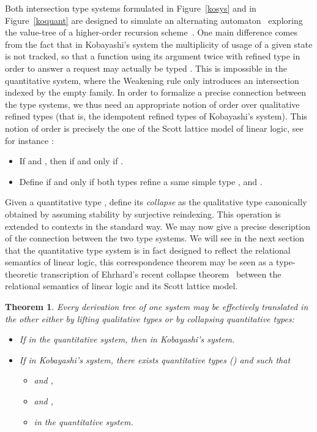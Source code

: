 \documentclass{eptcs}
\newtheorem{theorem}{Theorem}
\begin{document}
Both intersection type systems formulated in Figure~\ref{kosys}
and in Figure~\ref{koquant} are designed to simulate an alternating automaton~
exploring the value-tree of a higher-order recursion scheme~.
One main difference comes from the fact that in Kobayashi's system the multiplicity of usage 
of a given state is not tracked, so that a function using its argument twice with refined type 
in order to answer a request  may actually be typed . 
This is impossible in the quantitative system, where the Weakening rule only introduces an intersection indexed by the empty family. In order to formalize a precise connection between the type systems, we thus need an appropriate notion of order over qualitative refined types (that is, the idempotent refined types of Kobayashi's system). 
This notion of order is precisely the one of the Scott lattice model of linear logic, see for instance \cite{terui,ehrhard-collapse}:
\begin{itemize}
\item If  and , then  if and only if .
\item Define  if and only if both types refine a same simple type ,  and .
\end{itemize}
Given a quantitative type , define its \emph{collapse}  as the qualitative type canonically obtained by assuming stability by surjective reindexing. 
This operation is extended to contexts in the standard way. 
We may now give a precise description of the connection between the two type systems.
We will see in the next section that the quantitative type system is in fact designed to reflect the relational semantics of linear logic,
this correspondence theorem may be seen as a type-theoretic transcription of Ehrhard's recent collapse theorem~\cite{ehrhard-collapse}
between the relational semantics of linear logic and its Scott lattice model.
\begin{theorem}\label{theorem/correspondence}
Every derivation tree of one system may be effectively translated in the other either by lifting qualitative types or by collapsing quantitative types:
\begin{itemize}
\item If  in the quantitative system, then  in Kobayashi's system.
\item If  in Kobayashi's system, 
there exists quantitative types  () and  such that
\begin{itemize}
\item  and ,
\item  and ,
\item  in the quantitative system.
\end{itemize}
\end{itemize}
\end{theorem}
\end{document}

